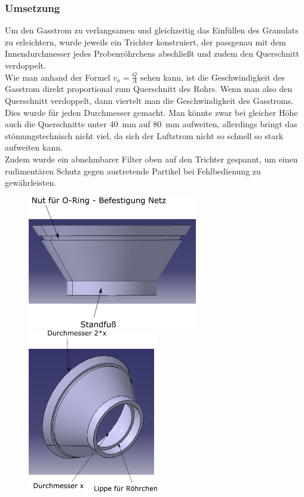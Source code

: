 \subsubsection{Umsetzung}

Um den Gasstrom zu verlangsamen und gleichzeitig das Einfüllen des Granulats zu erleichtern, wurde jeweils ein Trichter konstruiert, der passgenau mit dem Innendurchmesser jedes Probenröhrchens abschließt und zudem den Querschnitt verdoppelt. \\
Wie man anhand der Formel $v_a = \frac{Q}{A}$ \cite{Grollius2012} sehen kann, ist die Geschwindigkeit des Gasstrom direkt proportional zum Querschnitt des Rohrs. Wenn man also den Querschnitt verdoppelt, dann viertelt man die Geschwindigkeit des Gasstroms. Dies wurde für jeden Durchmesser gemacht. Man könnte zwar bei gleicher Höhe auch die Querschnitte unter \SI{40}{mm} auf \SI{80}{mm} aufweiten, allerdings bringt das stömungstechnisch nicht viel, da sich der Luftstrom nicht so schnell so stark aufweiten kann. \\
Zudem wurde ein abnehmbarer Filter oben auf den Trichter gespannt, um einen rudimentären Schutz gegen austretende Partikel bei Fehlbedienung zu gewährleisten.

	\begin{figure}[h]
		\begin{minipage}[hbt]{7.4cm}
			\centering
			\includegraphics[width=7.4cm]{Trichter_frontal.png}
		\end{minipage}
		\hfill
		\begin{minipage}[hbt]{5.7cm}
			\centering
			\includegraphics[width=5.7cm]{Trichter_unten.png}
		\end{minipage}
	\end{figure}


